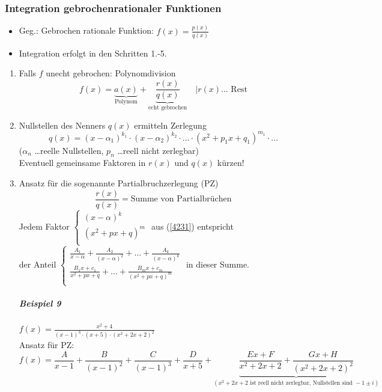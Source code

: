 \documentclass[a4paper]{scrartcl}
\begin{document}
\subsubsection{Integration gebrochenrationaler Funktionen}
\begin{itemize}
\item Geg.: Gebrochen rationale Funktion: $f(x) = \frac{p(x)}{q(x)}$
\item Integration erfolgt in den Schritten 1.-5.
\end{itemize}
\begin{enumerate}
\item Falls $f$ unecht gebrochen: Polynomdivision
\[f(x) = \underbrace{a(x)}_{\text{Polynom}} + \underbrace{\frac{r(x)}{q(x)}}_{\text{echt gebrochen}} \quad | r(x) \dots \text{ Rest} \]
\item Nullstellen des Nenners $q(x)$ ermitteln
Zerlegung \begin{equation}\label{4231} q(x) = (x-\alpha_1)^{k_1} \cdot (x-\alpha_2)^{k_2} \cdot \dots \cdot (x^2 + p_1 x + q_1)^{m_1} \cdot \dots \end{equation}
($\alpha_n$ \dots reelle Nullstellen, $p_n$ \dots reell nicht zerlegbar)\\
Eventuell gemeinsame Faktoren in $r(x)$ und $q(x)$ kürzen!
\item Ansatz für die sogenannte Partialbruchzerlegung (PZ)
\[\frac{r(x)}{q(x)} = \text{Summe von Partialbrüchen}\]
Jedem Faktor $\left\{ \begin{array}{c} (x-\alpha)^k \\ (x^2 + px +q)^m \\ \end{array} \right.$ aus (\ref{4231}) entspricht\\ der Anteil $\left\{ \begin{array}{c}
\frac{A_1}{x-\alpha} + \frac{A_2}{(x-\alpha)^2} + \dots + \frac{A_k}{(x-\alpha)^k} \\
\frac{B_1x + c_1}{x^2 +px +q} + \dots + \frac{B_mx + c_m}{(x^2 + px + q)^m} \\
\end{array}\right.$
in dieser Summe.

\subparagraph{Beispiel 9} $f(x) = \frac{x^2+4}{(x-1)^3 \cdot (x+5) \cdot (x^2 + 2x + 2)^2}$\\
Ansatz für PZ:
\[f(x) = \frac{A}{x-1} + \frac{B}{(x-1)^2} + \frac{C}{(x-1)^3} + \frac{D}{x+5} + \underbrace{ \frac{Ex+F}{x^2+2x+2} + \frac{Gx+H}{(x^2 + 2x +2)^2}}_{(x^2 +2x +2 \text{ ist reell nicht zerlegbar, Nullstellen sind } -1\pm i)}\]


\end{enumerate}
\end{document}
